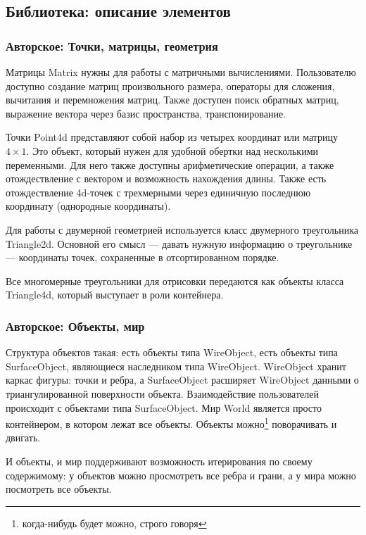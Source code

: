 \documentclass{article}
\begin{document}
\newpage

\subsection{Библиотека: описание элементов}

\subsubsection{Авторское: Точки, матрицы, геометрия}

Матрицы Matrix нужны для работы с матричными вычислениями. Пользователю доступно создание матриц произвольного размера, операторы для сложения, вычитания и перемножения матриц. Также доступен поиск обратных матриц, выражение вектора через базис пространства, транспонирование.

Точки Point4d представляют собой набор из четырех координат или матрицу $4 \times 1$. Это объект, который нужен для удобной обертки над несколькими переменными. Для него также доступны арифметические операции, а также отождествление с вектором и возможность нахождения длины. Также есть отождествление 4d-точек с трехмерными через единичную последнюю координату (однородные координаты).

Для работы с двумерной геометрией используется класс двумерного треугольника Triangle2d. Основной его смысл — давать нужную информацию о треугольнике — координаты точек, сохраненные в отсортированном порядке.

Все многомерные треугольники для отрисовки передаются как объекты класса Triangle4d, который выступает в роли контейнера.

\subsubsection{Авторское: Объекты, мир}

Структура объектов такая: есть объекты типа WireObject, есть объекты типа SurfaceObject, являющиеся наследником типа WireObject. WireObject хранит каркас фигуры: точки и ребра, а SurfaceObject расширяет WireObject данными о триангулированной поверхности объекта. Взаимодействие пользователей происходит с объектами типа SurfaceObject. Мир World является просто контейнером, в котором лежат все объекты. Объекты можно\footnote{ когда-нибудь будет можно, строго говоря} поворачивать и двигать.

И объекты, и мир поддерживают возможность итерирования по своему содержимому: у объектов можно просмотреть все ребра и грани, а у мира можно посмотреть все объекты.
\end{document}
